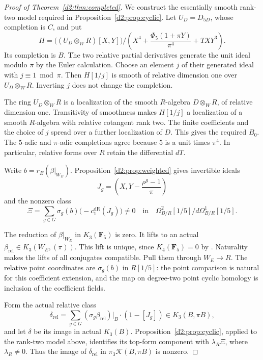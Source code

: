 \documentclass[11pt,a4paper]{amsart}
\numberwithin{equation}{section}
\theoremstyle{definition}
\theoremstyle{remark}
\newcommand{\DtwoFF}{\mathbf{F}}
\newcommand{\DtwocK}{\mathcal K}
\newcommand{\DtwodR}{\mathrm{dR}}
\begin{document}
\begin{proof}[Proof of Theorem~\ref{d2:thm:completed}]
We construct the essentially smooth rank-two model required in
Proposition~\ref{d2:prop:cyclic}.
Let \(U_D=D_{5D}\), whose completion is \(C\), and put
\[
 H=
 \bigl((U_D\otimes_WR)[X,Y]\bigr)/
 \left(X^4+\frac{\Phi_5(1+\pi Y)}{\pi^4}+TXY^3\right).
\]
Its completion is \(B\).
The two relative partial derivatives generate the unit ideal
modulo \(\pi\) by the Euler calculation.
Choose an element \(j\) of their generated ideal with
\(j\equiv1\bmod\pi\).
Then \(H[1/j]\) is smooth of relative dimension one over
\(U_D\otimes_WR\).
Inverting \(j\) does not change the completion.

The ring \(U_D\otimes_WR\) is a localization of the smooth
\(R\)-algebra \(D\otimes_WR\), of relative dimension one.
Transitivity of smoothness makes \(H[1/j]\) a localization of a
smooth \(R\)-algebra with relative cotangent rank two.
The finite coefficients and the choice of \(j\) spread over a
further localization of \(D\).
This gives the required \(B_0\).
The \(5\)-adic and \(\pi\)-adic completions agree because \(5\)
is a unit times \(\pi^4\).
In particular, relative forms over \(R\) retain the differential
\(dT\).

Write \(b=r_E(\beta|_{W_E})\).
Proposition~\ref{d2:prop:weighted} gives invertible ideals
\[
 J_g=\left(X,Y-\frac{\rho^g-1}{\pi}\right)
\]
and the nonzero class
\begin{equation}\label{d2:eq:completed-form}
 \Xi=\sum_{g\in G}\sigma_g(b)\bigl(-c_1^\DtwodR(J_g)\bigr)
 \ne0
 \quad\text{in}\quad
 \Omega^2_{B/R}[1/5]\big/d\Omega^1_{B/R}[1/5].
\end{equation}

The reduction of \(\beta|_{W_E}\) in \(K_3(\DtwoFF_5)\) is zero.
It lifts to an actual
\(\beta_{\mathrm{rel}}\in K_3(W_E,(\pi))\).
This lift is unique, since \(K_4(\DtwoFF_5)=0\) by
\cite{QuillenFinite}\cite[IV, Corollary~1.13]{Weibel}.
Naturality makes the lifts of all conjugates compatible.
Pull them through \(W_E\to R\).
The relative point coordinates are \(\sigma_g(b)\) in \(R[1/5]\):
the point comparison is natural for this coefficient extension,
and the map on degree-two point cyclic homology is inclusion of
the coefficient fields.

Form the actual relative class
\[
 \delta_{\mathrm{rel}}
   =\sum_{g\in G}
      (\sigma_g\beta_{\mathrm{rel}})|_B\cdot(1-[J_g])
       \in K_3(B,\pi B),
\]
and let \(\delta\) be its image in actual \(K_3(B)\).
Proposition~\ref{d2:prop:cyclic}, applied to the rank-two model above,
identifies its top-form component with \(\lambda_R\Xi\), where
\(\lambda_R\ne0\).
Thus the image of \(\delta_{\mathrm{rel}}\) in
\(\pi_3\DtwocK(B,\pi B)\) is nonzero.


\end{proof}
\end{document}
